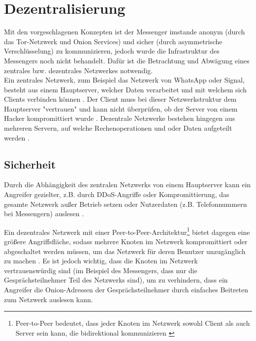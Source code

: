 \documentclass[a4paper,ngerman, headheight=28pt,12pt]{scrartcl}
\newcommand{\vcite}[1]{\cite[vgl.][]{#1}}
\begin{document}
\section{Dezentralisierung}
Mit den vorgeschlagenen Konzepten ist der Messenger imstande anonym (durch das Tor-Netzwerk und Onion Services) und sicher (durch asymmetrische Verschlüsselung) zu kommunizieren, jedoch wurde die Infrastruktur des Messengers noch nicht behandelt. Dafür ist die Betrachtung und Abwägung eines zentrales bzw. dezentrales Netzwerkes notwendig. \\
Ein zentrales Netzwerk, zum Beispiel das Netzwerk von WhatsApp oder Signal, besteht aus einem Hauptserver, welcher Daten verarbeitet und mit welchem sich Clients verbinden können \vcite{WhatsappCentralized,SignalCentralized, CentralizedDefinition}.
Der Client muss bei dieser Netzwerkstruktur dem Hauptserver "vertrauen" und kann nicht überprüfen, ob der Server von einem Hacker kompromittiert wurde \vcite{MessagingNetwork}. Dezentrale Netzwerke bestehen hingegen aus mehreren Servern, auf welche Rechenoperationen und oder Daten aufgeteilt werden \vcite{DecentralizedDefinition}.


\subsection{Sicherheit}
Durch die Abhängigkeit des zentralen Netzwerks von einem Hauptserver kann ein Angreifer gezielter, z.B. durch DDoS-Angriffe oder Kompromittierung, das gesamte Netzwerk außer Betrieb setzen oder Nutzerdaten (z.B. Telefonnummern bei Messengern) auslesen \vcite{BSI-DDoS}.

Ein dezentrales Netzwerk mit einer Peer-to-Peer-Architektur\footnote{Peer-to-Peer bedeutet, dass jeder Knoten im Netzwerk sowohl Client als auch Server sein kann, die bidirektional kommunizieren \vcite{PeerToPeerDef}} bietet dagegen eine größere Angriffsfläche, sodass mehrere Knoten im Netzwerk kompromittiert oder abgeschaltet werden müssen, um das Netzwerk für deren Benutzer unzugänglich zu machen \vcite{GeeksCentralizeDecentralized}.
Es ist jedoch wichtig, dass die Knoten im Netzwerk vertrauenswürdig sind (im Beispiel des Messengers, dass nur die Gesprächsteilnehmer Teil des Netzwerks sind), um zu verhindern, dass ein Angreifer die Onion-Adressen der Gesprächsteilnehmer durch einfaches Beitreten zum Netzwerk auslesen kann.
\end{document}
